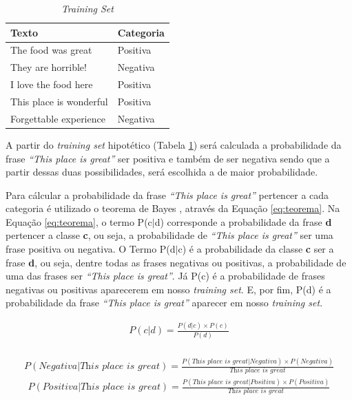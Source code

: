 \begin{table}[htb]
\centering
\begin{tabular}{|l|l|}
\hline
Texto  & Categoria \\ \hline
The food was great  & Positiva     \\ \hline
They are horrible!    & Negativa     \\ \hline
I love the food here  & Positiva     \\ \hline
This place is wonderful  & Positiva     \\ \hline
Forgettable experience  & Negativa     \\ \hline
\end{tabular}
\caption{\textit{Training Set}}
\label{tab:trainingsetnb}
\end{table}

A partir do \textit{training set} hipotético (Tabela
\ref{tab:trainingsetnb}) será calculada a probabilidade da frase
\textit{``This place is great''} ser positiva e também de ser negativa sendo que
a partir dessas duas possibilidades, será escolhida a de maior probabilidade.

Para cálcular a probabilidade da frase \textit{``This place is great''}
pertencer a cada categoria é utilizado o teorema de Bayes \cite{manningschutze1999}, através da Equação
\ref{eq:teorema}. Na Equação \ref{eq:teorema}, o termo P(c$\vert$d) corresponde
a probabilidade da frase \textbf{d} pertencer a classe \textbf{c}, ou seja, a
probabilidade de \textit{``This place is great''} ser uma frase positiva ou negativa. O Termo P(d$\vert$c) é a probabilidade da
  classe \textbf{c} ser a frase \textbf{d}, ou seja, dentre todas as frases
  negativas ou positivas, a probabilidade de uma das frases ser \textit{``This
  place is great''}. Já P(c) é a probabilidade de frases negativas ou positivas
  aparecerem em nosso \textit{training set}. E, por fim, P(d) é a probabilidade
  da frase \textit{``This place is great''} aparecer em nosso \textit{training
  set}.

\begin{equation}
\begin{gathered}
P(c|d) = \frac{P(d|c) \times P(c)}{P(d)} \\
\label{eq:teorema}
\end{gathered}
\end{equation}

\begin{equation}
\begin{gathered}
P(Negativa|\textit{This place is great})
=
\frac{P(\textit{This place is great}|Negativa) \times
P(Negativa)}{\textit{This place is great}}
\label{eq:teoreman1}
\end{gathered}
\end{equation}
\begin{equation}
\begin{gathered}
P(Positiva|\textit{This place is great})
=
\frac{P(\textit{This place is great}|Positiva) \times
P(Positiva)}{\textit{This place is great}}
\label{eq:teoremap1}
\end{gathered}
\end{equation}


